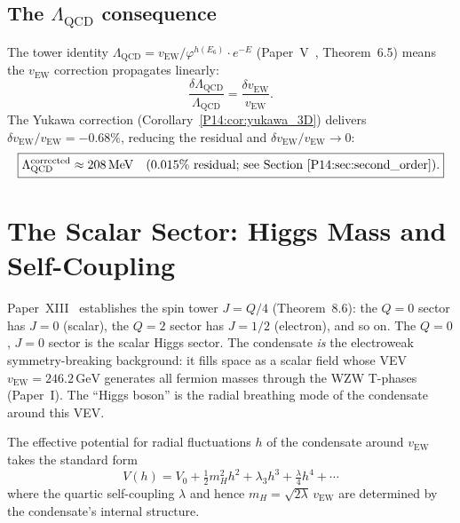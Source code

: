 \documentclass[11pt,a4paper]{article}
\theoremstyle{definition}
\theoremstyle{remark}
\newcommand{\vp}{\varphi}
\newcommand{\vEW}{v_{\mathrm{EW}}}
\newcommand{\LQCD}{\Lambda_{\mathrm{QCD}}}
\newcommand{\mH}{m_H}
\begin{document}
\subsection{The $\LQCD$ consequence}

The tower identity $\LQCD = \vEW/\vp^{h(E_6)}\cdot e^{-E}$
(Paper~V~\cite{Paper5}, Theorem~6.5) means
the $\vEW$ correction propagates linearly:
\begin{equation}
  \frac{\delta\LQCD}{\LQCD} = \frac{\delta\vEW}{\vEW}.
  \label{P14:eq:lqcd_chain}
\end{equation}
The Yukawa correction (Corollary~\ref{P14:cor:yukawa_3D}) delivers
$\delta\vEW/\vEW = -0.68\%$, reducing the residual and $\delta\vEW/\vEW\to0$:
\begin{equation}
  \boxed{\LQCD^{\rm corrected} \approx 208\,\mathrm{MeV}
  \quad(0.015\%\text{ residual; see Section~\ref{P14:sec:second_order}}).}
  \label{P14:eq:lqcd_target}
\end{equation}

\section{The Scalar Sector: Higgs Mass and Self-Coupling}
\label{P14:sec:higgs}

Paper~XIII~\cite{Paper13} establishes the spin tower $J=Q/4$
(Theorem~8.6): the $Q=0$ sector has $J=0$
(scalar), the $Q=2$ sector has $J=1/2$ (electron), and so on.
The $Q=0$, $J=0$ sector is the scalar Higgs sector.
The condensate \emph{is} the electroweak symmetry-breaking background:
it fills space as a scalar field whose VEV $\vEW=246.2\,\mathrm{GeV}$
generates all fermion masses through the WZW T-phases (Paper~I).
The ``Higgs boson'' is the radial breathing mode of the condensate
around this VEV.

The effective potential for radial fluctuations $h$ of the condensate
around $\vEW$ takes the standard form
\begin{equation}
  V(h) = V_0 + \tfrac{1}{2}\mH^2 h^2 + \lambda_3 h^3 + \tfrac{\lambda}{4}h^4 + \cdots
  \label{P14:eq:higgs_potential}
\end{equation}
where the quartic self-coupling $\lambda$ and hence $\mH = \sqrt{2\lambda}\,\vEW$
are determined by the condensate's internal structure.
\end{document}
